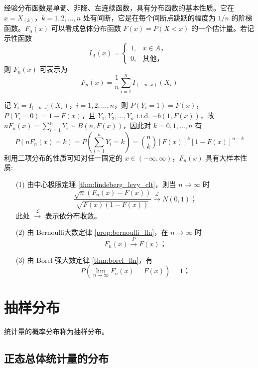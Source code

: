 \begin{remark}
    经验分布函数是单调、非降、左连续函数，具有分布函数的基本性质。它在 $x=X_{(k)}$，$k=1,2,\ldots,n$ 处有间断，它是在每个间断点跳跃的幅度为 $1/n$ 的阶梯函数。$F_n(x)$ 可以看成总体分布函数 $F(x) = P(X < x)$ 的一个估计量。若记示性函数
\[
I_A(x)=
\begin{cases}
1, & x \in A， \\
0, & \text{其他}，
\end{cases}
\]
则 $F_n(x)$ 可表示为
\begin{equation} \label{eq:fn_as_sum_of_indicators}
F_n(x) = \frac{1}{n}\sum_{i=1}^n I_{(-\infty,x)}(X_i)
\end{equation}
\end{remark}
记 $Y_i = I_{(-\infty,x]}(X_i)$，$i=1,2,\ldots,n$，则 $P(Y_i=1) = F(x)$，$P(Y_i=0) = 1-F(x)$，且 $Y_1, Y_2, \ldots, Y_n$ i.i.d. $\sim b(1,F(x))$，故 $nF_n(x) = \sum_{i=1}^n Y_i \sim B(n,F(x))$，因此对 $k=0,1,\ldots,n$ 有
\[
P\left(nF_n(x)=k\right) = P\left(\sum_{i=1}^n Y_i=k\right) = \binom{n}{k}[F(x)]^k[1-F(x)]^{n-k}
\]
利用二项分布的性质可知对任一固定的 $x \in (-\infty,\infty)$，$F_n(x)$ 具有大样本性质:
\begin{proposition}[经验分布函数的大样本性质]\label{prop:经验分布函数的大样本性质}
    \begin{enumerate}
    \item[(1)] 由中心极限定理 \ref{thm:lindeberg_levy_clt}，则当 $n \to \infty$ 时
    \[
    \frac{\sqrt{n}(F_n(x) - F(x))}{\sqrt{F(x)(1-F(x))}} \xrightarrow{\mathscr{L}} N(0,1)；
    \]
    此处 $\xrightarrow{\mathscr{L}}$ 表示依分布收敛。

    \item[(2)] 由 Bernoulli大数定律 \ref{prop:bernoulli_lln}，在 $n \to \infty$ 时
    \[
    F_n(x) \xrightarrow{P} F(x)；
    \]
    \item[(3)] 由 Borel 强大数定律 \ref{thm:borel_lln}，有
    \[
    P\left( \lim_{n\to\infty} F_n(x) = F(x) \right) = 1；
    \]
\end{enumerate}
\end{proposition}

\section{抽样分布}\label{sec:抽样分布}
统计量的概率分布称为抽样分布。
\subsection{正态总体统计量的分布}\label{subsec:正态总体统计量的分布}

